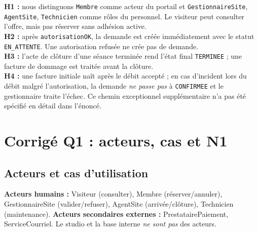 \documentclass[10pt,a4paper]{article}
\begin{document}
\begin{answerbox}
\textbf{H1 :} nous distinguons \texttt{Membre} comme acteur du portail et \texttt{GestionnaireSite}, \texttt{AgentSite}, \texttt{Technicien} comme rôles du personnel. Le visiteur peut consulter l'offre, mais pas réserver sans adhésion active.\\
\textbf{H2 :} après \texttt{autorisationOK}, la demande est créée immédiatement avec le statut \texttt{EN\_ATTENTE}. Une autorisation refusée ne crée pas de demande.\\
\textbf{H3 :} l'acte de clôture d'une séance terminée rend l'état final \texttt{TERMINEE} ; une facture de dommage est traitée avant la clôture.\\
\textbf{H4 :} une facture initiale naît après le débit accepté ; en cas d'incident lors du débit malgré l'autorisation, la demande \emph{ne passe pas} à \texttt{CONFIRMEE} et le gestionnaire traite l'échec. Ce chemin exceptionnel supplémentaire n'a pas été spécifié en détail dans l'énoncé.
\end{answerbox}

\section{Corrigé Q1 : acteurs, cas et N1}
\subsection{Acteurs et cas d'utilisation}
\textbf{Acteurs humains :} Visiteur (consulter), Membre (réserver/annuler), GestionnaireSite (valider/refuser), AgentSite (arrivée/clôture), Technicien (maintenance). \textbf{Acteurs secondaires externes :} PrestatairePaiement, ServiceCourriel. Le studio et la base interne \emph{ne sont pas} des acteurs.
\end{document}
